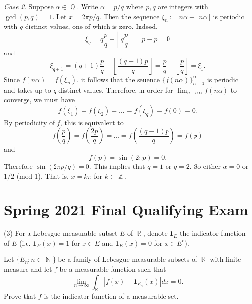 \documentclass[answers]{exam}
\DeclareMathOperator{\RR}{\mathbb{R}}
\DeclareMathOperator{\ZZ}{\mathbb{Z}}
\DeclareMathOperator{\NN}{\mathbb{N}}
\DeclareMathOperator{\QQ}{\mathbb{Q}}
\def\({\left (}
\def\){\right )}
\begin{document}
\begin{questions}
\begin{solution}
  \textit{Case 2.} Suppose $\alpha\in\QQ$. Write $\alpha = p/q$ where $p,q$ are integers with $\gcd(p,q)=1$. Let $x = 2\pi p/q$. Then the sequence $\xi_{n}:= n\alpha-\lfloor n \alpha \rfloor$ is periodic with $q$ distinct values, one of which is zero. Indeed,
  \begin{equation*}
    \xi_{q}=q \frac{p}{q} - \left\lfloor q \frac{p}{q} \right\rfloor = p-p = 0
  \end{equation*}
  and
  \begin{equation*}
    \xi_{q+1}= (q+1)\frac{p}{q} - \left\lfloor \frac{(q+1)p}{q} \right\rfloor = \frac{p}{q} - \left\lfloor \frac{p}{q}\right\rfloor = \xi_{1}.
  \end{equation*}
  Since $f(n\alpha) = f(\xi_{n})$, it follows that the seuence $\{f(n\alpha)\}_{n=1}^{\infty}$ is periodic and takes up to $q$ distinct values. Therefore, in order for $\lim_{n \to \infty} f(n\alpha)$ to converge, we must have
  \[ f(\xi_{1})=f(\xi_{2})=\ldots=f(\xi_{q})=f(0)=0. \]
  By periodicity of $f$, this is equivalent to
	\begin{equation*}
    f\(\frac{p}{q}\)= f\(\frac{2p}{q}\)=\ldots=f\left(\frac{(q-1)p}{q}\right)=f(p)
  \end{equation*}
  and
  \begin{equation*}
    f(p) = \sin(2\pi p)=0.
  \end{equation*}
  Therefore $\sin(2\pi p/q)=0$. This implies that $q=1$ or $q=2$. So either $\alpha =0$ or $1/2$ (mod 1). That is, $x=k\pi$ for $k\in \ZZ$.
\end{solution}


\newpage
\section{Spring 2021 Final Qualifying Exam}

\question (3) For a Lebesgue measurable subset $E$ of $\RR$, denote $\textbf{1}_E$ the indicator function of $E$ (i.e. $\textbf{1}_E(x)=1$ for $x\in E$ and $\textbf{1}_E(x) = 0$ for $x\in E^c$).

Let $\{E_n: n\in \NN\}$ be a family of Lebesgue measurable subsets of $\RR$ with finite measure and let $f$ be a measurable function such that \begin{equation*}
\lim_{n \to \infty} \int_{\RR} | f(x)-\textbf{1}_{E_n}(x)| dx = 0.
\end{equation*}
Prove that $f$ is the indicator function of a measurable set.


\end{questions}
\end{document}
